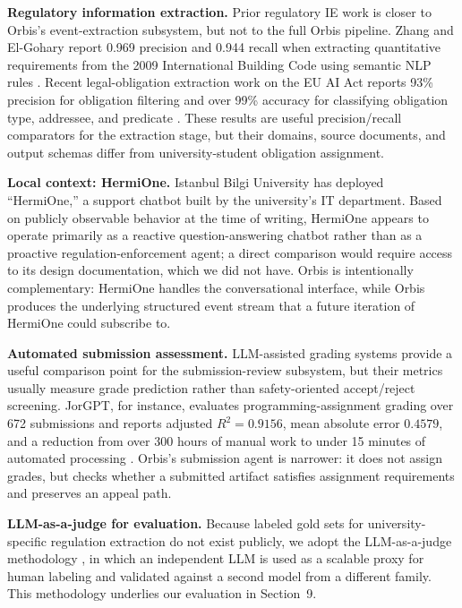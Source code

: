 \documentclass[a4paper,12pt]{article}
\begin{document}
\textbf{Regulatory information extraction.} Prior regulatory IE work is closer to Orbis's event-extraction subsystem, but not to the full Orbis pipeline. Zhang and El-Gohary report 0.969 precision and 0.944 recall when extracting quantitative requirements from the 2009 International Building Code using semantic NLP rules \cite{zhang2016semantic}. Recent legal-obligation extraction work on the EU AI Act reports 93\% precision for obligation filtering and over 99\% accuracy for classifying obligation type, addressee, and predicate \cite{galli2025aiAct}. These results are useful precision/recall comparators for the extraction stage, but their domains, source documents, and output schemas differ from university-student obligation assignment.

\textbf{Local context: HermiOne.} Istanbul Bilgi University has deployed ``HermiOne,'' a support chatbot built by the university's IT department. Based on publicly observable behavior at the time of writing, HermiOne appears to operate primarily as a reactive question-answering chatbot rather than as a proactive regulation-enforcement agent; a direct comparison would require access to its design documentation, which we did not have. Orbis is intentionally complementary: HermiOne handles the conversational interface, while Orbis produces the underlying structured event stream that a future iteration of HermiOne could subscribe to.

\textbf{Automated submission assessment.} LLM-assisted grading systems provide a useful comparison point for the submission-review subsystem, but their metrics usually measure grade prediction rather than safety-oriented accept/reject screening. JorGPT, for instance, evaluates programming-assignment grading over 672 submissions and reports adjusted $R^2{=}0.9156$, mean absolute error $0.4579$, and a reduction from over 300 hours of manual work to under 15 minutes of automated processing \cite{cisneros2025jorgpt}. Orbis's submission agent is narrower: it does not assign grades, but checks whether a submitted artifact satisfies assignment requirements and preserves an appeal path.

\textbf{LLM-as-a-judge for evaluation.} Because labeled gold sets for university-specific regulation extraction do not exist publicly, we adopt the LLM-as-a-judge methodology \cite{zheng2023judging}, in which an independent LLM is used as a scalable proxy for human labeling and validated against a second model from a different family. This methodology underlies our evaluation in Section~9.
\end{document}
